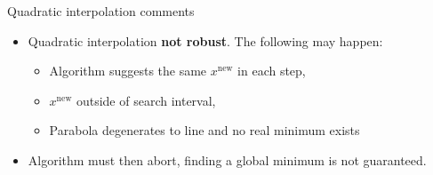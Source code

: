 \documentclass[11pt,compress,t,notes=noshow, xcolor=table]{beamer}
\begin{document}
\begin{vbframe}{Quadratic interpolation comments}
\begin{itemize}
\item Quadratic interpolation \textbf{not robust}. The following may happen:
\begin{itemize}
\item Algorithm suggests the same $x^{\text{new}}$ in each step,
\item $x^{\text{new}}$ outside of search interval,
\item Parabola degenerates to line and no real minimum exists 
\end{itemize}
\item Algorithm must then abort, finding a global minimum is not guaranteed.
\end{itemize}
\end{vbframe}
\end{document}
